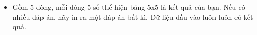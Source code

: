 \begin{itemize}
	\item Gồm 5 dòng, mỗi dòng 5 số thể hiện bảng 5x5 là kết quả của bạn. Nếu có nhiều đáp án, hãy in ra một đáp án bất kì. Dữ liệu đầu vào luôn luôn có kết quả.
\end{itemize}
